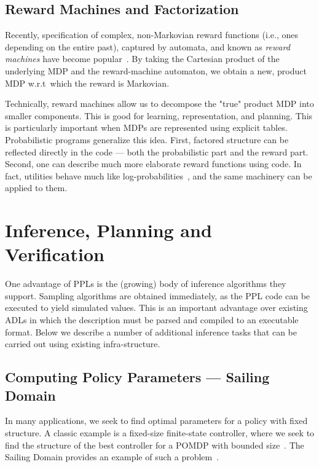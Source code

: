\documentclass[letterpaper]{article} %
\theoremstyle{definition}
\begin{document}
\subsection{Reward Machines and Factorization}
Recently, specification of complex, non-Markovian reward functions (i.e., ones depending on the entire past), captured by automata, and known as {\em reward machines} have become popular~\cite{RewardMachines}.
By taking the Cartesian product of
the underlying MDP and the reward-machine automaton, we
obtain a new, product MDP w.r.t~which the reward is Markovian.

Technically, reward machines allow us to decompose the "true" product MDP into smaller components. This is good for learning, representation, and planning. This is particularly important when MDPs are represented using
explicit tables. Probabilistic programs generalize this idea.
First, factored structure can be reflected directly in the code --- both the probabilistic part and the reward part.
Second, one can describe much more elaborate reward functions using code. In fact, utilities behave much like log-probabilities~\cite{wgr+:11,mpt+:16}, and the same machinery can be applied to them.




\section{Inference, Planning and Verification}
One advantage of PPLs is the (growing) body of inference algorithms they support. Sampling algorithms are obtained immediately, as the PPL code can be executed to yield simulated values. This is an important advantage over existing ADLs in which the description must be parsed and compiled to
an executable format.
Below we describe a number of additional inference tasks that can
be carried out using existing infra-structure.

\subsection{Computing Policy Parameters --- Sailing Domain}
In many applications, we seek to find optimal parameters for a policy
with fixed structure. A classic example is a fixed-size finite-state
controller, where we seek to find the structure of the best controller
for a POMDP with bounded size~\cite{meuleau1999learning,Poupart3}. The
Sailing Domain provides an example of such a problem~\cite{pg:04,ts:12}.
\end{document}

